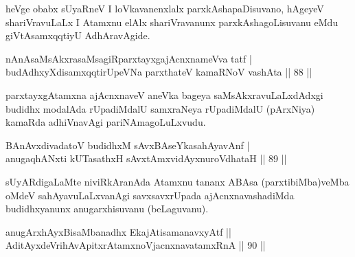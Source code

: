 \begin{artha}
heVge obabx sUyaRneV I loVkavanenxlalx parxkAshapaDisuvano, hAgeyeV shariVravuLaLx I Atamxnu elAlx shariVravanunx parxkAshagoLisuvanu eMdu giVtAsamxqqtiyU AdhAravAgide.
\end{artha}


\begin{shl}
nAnAsaMsAkxrasaMsagiRparxtayxgajAcnxnameVva tatf | \\
budAdhxyXdisamxqqtirUpeVNa parxthateV kamaRNoV vashAta \hfill||  88 || 
\end{shl}

\begin{artha}
parxtayxgAtamxna ajAcnxnaveV aneVka bageya saMsAkxravuLaLxdAdxgi budidhx modalAda rUpadiMdalU samxraNeya rUpadiMdalU (pArxNiya) kamaRda adhiVnavAgi pariNAmagoLuLxvudu.
\end{artha}

\begin{shl}
BAnAvxdivadatoV budidhxM sAvxBAseYkasahAyavAnf | \\
anugaqhANxti kUTasathxH sAvxtAmxvidAyxnuroVdhataH \hfill||  89 ||  
\end{shl}

\begin{artha}
sUyARdigaLaMte niviRkAranAda Atamxnu tananx ABAsa (parxtibiMba)veMba oMdeV sahAyavuLaLxvanAgi savxsavxrUpada ajAcnxnavashadiMda budidhxyanunx anugarxhisuvanu (beLaguvanu).
\end{artha}



\begin{shl}
anugArxhAyxBisaMbanadhx EkajAtisamanavxyAtf ||  \\
\footnotemark[1]{}AditAyxdeVrihAvApitxrAtamxnoV\s jacnxnavatamxRnA \hfill||  90 ||  
\end{shl}


